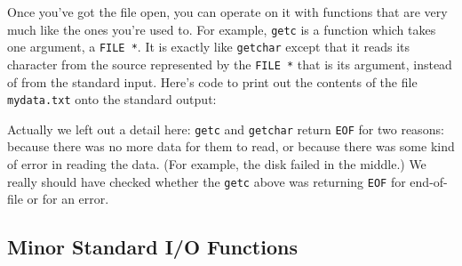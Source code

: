 Once you've got the file open, you can operate on it with functions that
are very much like the ones you're used to.  For example, {\tt getc} is
a function which takes one argument, a {\tt FILE *}.  It is exactly like
{\tt getchar} except that it reads its character from the source
represented by the {\tt FILE *} that is its argument, instead of from
the standard input.  Here's code to print out the contents of the file
{\tt mydata.txt} onto the standard output:


Actually we left out a detail here:  {\tt getc} and {\tt getchar} return
{\tt EOF} for two reasons:  because there was no more data for them to
read, or because there was some kind of error in reading the data.  (For
example, the disk failed in the middle.)  We really should have checked
whether the {\tt getc} above was returning {\tt EOF} for end-of-file or
for an error.

\subsection{Minor Standard I/O Functions}

